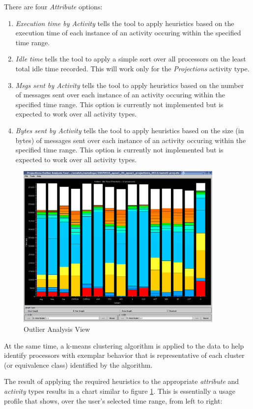 There are four {\em Attribute} options:
\begin{enumerate}
\item {\em Execution time by Activity} tells the tool to apply heuristics
based on the execution time of each instance of an activity occuring
within the specified time range.
\item {\em Idle time} tells the tool to apply a simple sort over all
processors on the least total idle time recorded. This will work only for
the {\em Projections} activity type.
\item {\em Msgs sent by Activity} tells the tool to apply heuristics
based on the number of messages sent over each instance of an
activity occuring within the specified time range. This option is
currently not implemented but is expected to work over all activity
types.
\item {\em Bytes sent by Activity} tells the tool to apply heuristics
based on the size (in bytes) of messages sent over each instance of an
activity occuring within the specified time range. This option is
currently not implemented but is expected to work over all activity
types.
\end{enumerate}

\begin{figure}[htb]
\center
\includegraphics[width=4.0in]{fig/apoa1_512_outlierWithClusters}
\caption{Outlier Analysis View}
\label{outlier view}
\end{figure}

At the same time, a k-means clustering algorithm is applied to the
data to help identify processors with exemplar behavior that is
representative of each cluster (or equivalence class) identified by
the algorithm.

The result of applying the required heuristics to the appropriate {\em
attribute} and {\em activity} types results in a chart similar to
figure \ref{outlier view}. This is essentially a usage profile that
shows, over the user's selected time range, from left to right:

